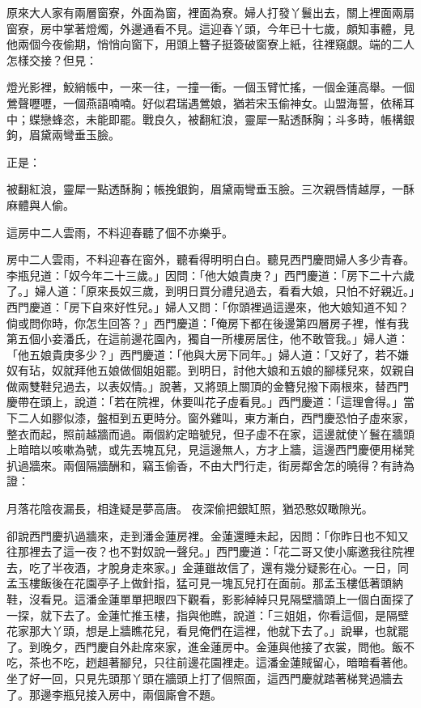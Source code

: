 原來大人家有兩層窗寮，外面為窗，裡面為寮。婦人打發丫鬟出去，關上裡面兩扇窗寮，房中掌著燈燭，外邊通看不見。這迎春丫頭，今年已十七歲，頗知事體，見他兩個今夜偷期，悄悄向窗下，用頭上簪子挺簽破窗寮上紙，往裡窺覷。端的二人怎樣交接？但見：

燈光影裡，鮫綃帳中，一來一往，一撞一衝。一個玉臂忙搖，一個金蓮高舉。一個鶯聲嚦嚦，一個燕語喃喃。好似君瑞遇鶯娘，猶若宋玉偷神女。山盟海誓，依稀耳中；蝶戀蜂恣，未能即罷。戰良久，被翻紅浪，靈犀一點透酥胸；斗多時，帳構銀鉤，眉黛兩彎垂玉臉。

正是：

被翻紅浪，靈犀一點透酥胸；帳挽銀鉤，眉黛兩彎垂玉臉。三次親唇情越厚，一酥麻體與人偷。

這房中二人雲雨，不料迎春聽了個不亦樂乎。

房中二人雲雨，不料迎春在窗外，聽看得明明白白。聽見西門慶問婦人多少青春。李瓶兒道：「奴今年二十三歲。」因問：「他大娘貴庚？」西門慶道：「房下二十六歲了。」婦人道：「原來長奴三歲，到明日買分禮兒過去，看看大娘，只怕不好親近。」西門慶道：「房下自來好性兒。」婦人又問：「你頭裡過這邊來，他大娘知道不知？倘或問你時，你怎生回答？」西門慶道：「俺房下都在後邊第四層房子裡，惟有我第五個小妾潘氏，在這前邊花園內，獨自一所樓房居住，他不敢管我。」婦人道：「他五娘貴庚多少？」西門慶道：「他與大房下同年。」婦人道：「又好了，若不嫌奴有玷，奴就拜他五娘做個姐姐罷。到明日，討他大娘和五娘的腳樣兒來，奴親自做兩雙鞋兒過去，以表奴情。」說著，又將頭上關頂的金簪兒撥下兩根來，替西門慶帶在頭上，說道：「若在院裡，休要叫花子虛看見。」西門慶道：「這理會得。」當下二人如膠似漆，盤桓到五更時分。窗外雞叫，東方漸白，西門慶恐怕子虛來家，整衣而起，照前越牆而過。兩個約定暗號兒，但子虛不在家，這邊就使丫鬟在牆頭上暗暗以咳嗽為號，或先丟塊瓦兒，見這邊無人，方才上牆，這邊西門慶便用梯凳扒過牆來。兩個隔牆酬和，竊玉偷香，不由大門行走，街房鄰舍怎的曉得？有詩為證：

月落花陰夜漏長，相逢疑是夢高唐。
夜深偷把銀缸照，猶恐憨奴瞰隙光。

卻說西門慶扒過牆來，走到潘金蓮房裡。金蓮還睡未起，因問：「你昨日也不知又往那裡去了這一夜？也不對奴說一聲兒。」西門慶道：「花二哥又使小廝邀我往院裡去，吃了半夜酒，才脫身走來家。」金蓮雖故信了，還有幾分疑影在心。一日，同孟玉樓飯後在花園亭子上做針指，猛可見一塊瓦兒打在面前。那孟玉樓低著頭納鞋，沒看見。這潘金蓮單單把眼四下觀看，影影綽綽只見隔壁牆頭上一個白面探了一探，就下去了。金蓮忙推玉樓，指與他瞧，說道：「三姐姐，你看這個，是隔壁花家那大丫頭，想是上牆瞧花兒，看見俺們在這裡，他就下去了。」說畢，也就罷了。到晚夕，西門慶自外赴席來家，進金蓮房中。金蓮與他接了衣裳，問他。飯不吃，茶也不吃，趔趄著腳兒，只往前邊花園裡走。這潘金蓮賊留心，暗暗看著他。坐了好一回，只見先頭那丫頭在牆頭上打了個照面，這西門慶就踏著梯凳過牆去了。那邊李瓶兒接入房中，兩個廝會不題。

